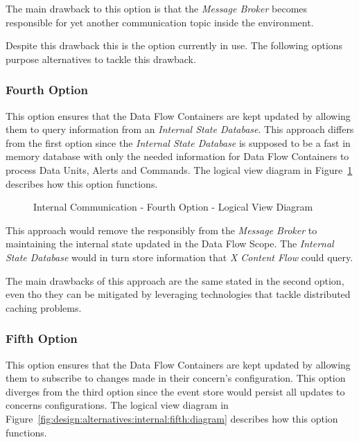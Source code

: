 The main drawback to this option is that the \textit{Message Broker} becomes responsible for yet another communication topic inside the environment.

Despite this drawback this is the option currently in use. The following options purpose alternatives to tackle this drawback.

\subsubsection{Fourth Option}
\label{subsubsec:design:alternatives:internal:fourth}

This option ensures that the Data Flow Containers are kept updated by allowing them to query information from an \textit{Internal State Database}. This approach differs from the first option since the \textit{Internal State Database} is supposed to be a fast in memory database with only the needed information for Data Flow Containers to process Data Units, Alerts and Commands. The logical view diagram in Figure~\ref{fig:design:alternatives:internal:fourth:diagram} describes how this option functions.

\begin{figure}[H]
   \centering
   \resizebox{\columnwidth}{!}
   {
      
   }
   \caption[Internal Communication - Fourth Option - Logical View Diagram]{Internal Communication - Fourth Option - Logical View Diagram}
   \label{fig:design:alternatives:internal:fourth:diagram}
\end{figure}

This approach would remove the responsibly from the \textit{Message Broker} to maintaining the internal state updated in the Data Flow Scope.
The \textit{Internal State Database} would in turn store information that \textit{X Content Flow} could query.

The main drawbacks of this approach are the same stated in the second option, even tho they can be mitigated by leveraging technologies that tackle distributed caching problems.

\subsubsection{Fifth Option}
\label{subsubsec:design:alternatives:internal:fifth}

This option ensures that the Data Flow Containers are kept updated by allowing them to subscribe to changes made in their concern's configuration. This option diverges from the third option since the event store would persist all updates to concerns configurations. The logical view diagram in Figure~\ref{fig:design:alternatives:internal:fifth:diagram} describes how this option functions.


